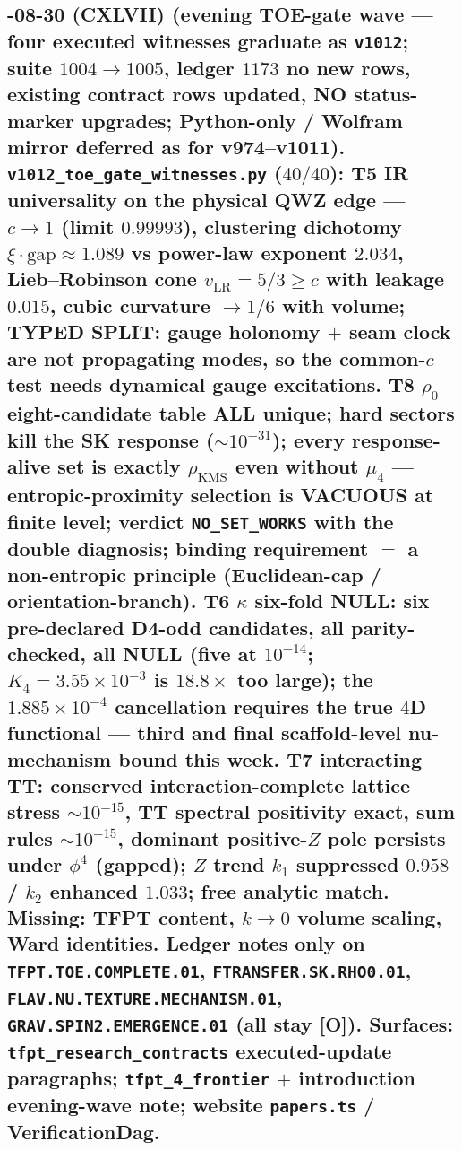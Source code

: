 \documentclass[11pt]{article}
\providecommand{\mO}{\textbf{[O]}}\providecommand{\mX}{\textbf{[X]}}
\begin{document}
\subsection*{-08-30 (CXLVII) (evening TOE-gate wave --- four executed witnesses graduate as \texttt{v1012}; suite $1004 \to 1005$, ledger $1173$ no new rows, existing contract rows updated, NO status-marker upgrades; Python-only / Wolfram mirror deferred as for v974--v1011).  \texttt{v1012\_\allowbreak toe\_\allowbreak gate\_\allowbreak witnesses.py} ($40/40$): T5 IR universality on the physical QWZ edge --- $c\to1$ (limit $0.99993$), clustering dichotomy $\xi{\cdot}\mathrm{gap}\approx1.089$ vs power-law exponent $2.034$, Lieb--Robinson cone $v_{\mathrm{LR}}=5/3\ge c$ with leakage $0.015$, cubic curvature $\to1/6$ with volume; TYPED SPLIT: gauge holonomy $+$ seam clock are not propagating modes, so the common-$c$ test needs dynamical gauge excitations.  T8 $\rho_0$ eight-candidate table ALL unique; hard sectors kill the SK response ($\sim10^{-31}$); every response-alive set is exactly $\rho_{\mathrm{KMS}}$ even without $\mu_4$ --- entropic-proximity selection is VACUOUS at finite level; verdict \texttt{NO\_SET\_WORKS} with the double diagnosis; binding requirement $=$ a non-entropic principle (Euclidean-cap / orientation-branch).  T6 $\kappa$ six-fold NULL: six pre-declared D4-odd candidates, all parity-checked, all NULL (five at $10^{-14}$; $K_4=3.55{\times}10^{-3}$ is $18.8{\times}$ too large); the $1.885{\times}10^{-4}$ cancellation requires the true $4$D functional --- third and final scaffold-level nu-mechanism bound this week.  T7 interacting TT: conserved interaction-complete lattice stress $\sim10^{-15}$, TT spectral positivity exact, sum rules $\sim10^{-15}$, dominant positive-$Z$ pole persists under $\phi^4$ (gapped); $Z$ trend $k_1$ suppressed $0.958$ / $k_2$ enhanced $1.033$; free analytic match.  Missing: TFPT content, $k\to0$ volume scaling, Ward identities.  Ledger notes only on \texttt{TFPT.TOE.COMPLETE.01}, \texttt{FTRANSFER.SK.RHO0.01}, \texttt{FLAV.NU.TEXTURE.MECHANISM.01}, \texttt{GRAV.SPIN2.EMERGENCE.01} (all stay \mO).  Surfaces: \texttt{tfpt\_research\_contracts} executed-update paragraphs; \texttt{tfpt\_4\_frontier} $+$ introduction evening-wave note; website \texttt{papers.ts} / VerificationDag.}
\end{document}
